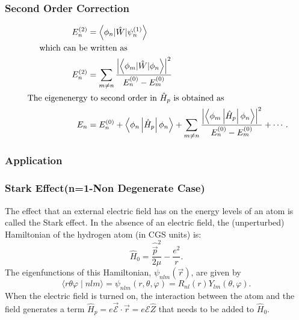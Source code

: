 \subsubsection{Second Order Correction}
\begin{align*}
E_{n}^{(2)}&=\left\langle\phi_{n}|\hat{W}| \psi_{n}^{(1)}\right\rangle\\
\text{which can  be}&\text{ written as}\\
E_{n}^{(2)}&=\sum_{m \neq n} \frac{\left|\left\langle\phi_{m}|\hat{W}| \phi_{n}\right\rangle\right|^{2}}{E_{n}^{(0)}-E_{m}^{(0)}}\\
\text{ The eigenenergy}&\text{ to second order in $ \hat{H}_{p}$ is obtained as }\\
E_{n}&=E_{n}^{(0)}+\left\langle\phi_{n}\left|\hat{H}_{p}\right| \phi_{n}\right\rangle+\sum_{m \neq n} \frac{\left|\left\langle\phi_{m}\left|\hat{H}_{p}\right| \phi_{n}\right\rangle\right|^{2}}{E_{n}^{(0)}-E_{m}^{(0)}}+\cdots .
\end{align*}






\subsubsection{Application}
\subsubsection{Stark Effect(n=1-Non Degenerate Case)}
 The effect that an external electric field has on the energy levels of an atom is called the Stark effect. In the absence of an electric field, the (unperturbed) Hamiltonian of the hydrogen atom (in CGS units) is:
$$
\hat{H}_{0}=\frac{\hat{\vec{p}}^{2}}{2 \mu}-\frac{e^{2}}{r} .
$$
The eigenfunctions of this Hamiltonian, $\psi_{n l m}(\vec{r})$, are given by
$$
\langle r \theta \varphi \mid n l m\rangle=\psi_{n l m}(r, \theta, \varphi)=R_{n l}(r) Y_{l m}(\theta, \varphi) .
$$
When the electric field is turned on, the interaction between the atom and the field generates a term $\hat{H}_{p}=e \overrightarrow{\mathcal{E}} \cdot \vec{r}=e \mathcal{E} \hat{Z}$ that needs to be added to $\hat{H}_{0}$.

